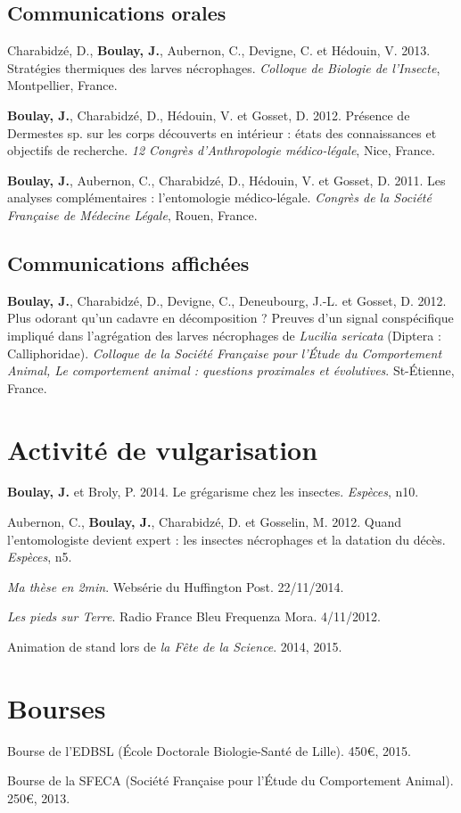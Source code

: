 	\subsection{Communications orales}
Charabidzé, D., \textbf{Boulay, J.}, Aubernon, C., Devigne, C. et Hédouin, V. 2013. Stratégies thermiques des larves nécrophages. \textit{Colloque de Biologie de l’Insecte}, Montpellier, France.

\textbf{Boulay, J.}, Charabidzé, D., Hédouin, V. et Gosset, D. 2012. Présence de Dermestes sp. sur les corps découverts en intérieur : états des connaissances et objectifs de recherche. \textit{12 Congrès d’Anthropologie médico-légale}, Nice, France.

\textbf{Boulay, J.}, Aubernon, C., Charabidzé, D., Hédouin, V. et Gosset, D. 2011. Les analyses complémentaires : l’entomologie médico-légale. \textit{Congrès de la Société Française de Médecine Légale}, Rouen, France.

    \subsection{Communications affichées}
\textbf{Boulay, J.}, Charabidzé, D., Devigne, C., Deneubourg, J.-L. et Gosset, D. 2012. Plus odorant qu’un cadavre en décomposition ? Preuves d’un signal conspécifique impliqué dans l’agrégation des larves nécrophages de \textit{Lucilia sericata} (Diptera : Calliphoridae). \textit{Colloque de la Société Française pour l’Étude du Comportement Animal, Le comportement animal : questions proximales et évolutives}. St-Étienne, France.    
    
    
    
\section{Activité de vulgarisation}

\textbf{Boulay, J.} et Broly, P. 2014. Le grégarisme chez les insectes. \textit{Espèces}, n10.

Aubernon, C., \textbf{Boulay, J.}, Charabidzé, D. et Gosselin, M. 2012. Quand l’entomologiste devient expert : les insectes nécrophages et la datation du décès. \textit{Espèces}, n5.

\textit{Ma thèse en 2min}. Websérie du Huffington Post. 22/11/2014. 

\textit{Les pieds sur Terre}. Radio France Bleu Frequenza Mora. 4/11/2012.

Animation de stand lors de \textit{la Fête de la Science}. 2014, 2015.

\section{Bourses}

Bourse de l'EDBSL (École Doctorale Biologie-Santé de Lille). 450\euro, 2015.

Bourse de la SFECA (Société Française pour l'Étude du Comportement Animal). 250\euro, 2013. 


\clearpage